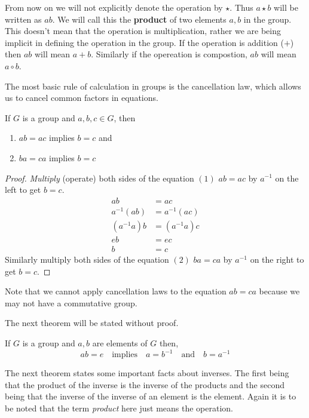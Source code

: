 \begin{Remark}\label{rmk:prod_notation}
    From now on we will not explicitly denote the operation by $\star$. Thus $a \star b$ will be written
    as $ab$. We will call this the \textbf{product} of two elements $a,b$ in the group. This doesn't mean that the
    operation is multiplication, rather we are being implicit in defining the operation in the group. If the
    operation is addition ($+$) then $ab$ will mean $a+b$. Similarly if the opereation is compostion, 
    $ab$ will mean $a\circ b$.
\end{Remark}

The most basic rule of calculation in groups is the cancellation law, which allows us to cancel
common factors in equations. 
\begin{Theorem}[name=Cancellation Laws in Groups]
    If $G$ is a group and $a,b,c \in G$, then
    \begin{enumerate}
	\item $ab = ac$ implies $b=c$ and
	\item $ba = ca$ implies $b=c$
    \end{enumerate}
\end{Theorem}
\begin{proof}
    \emph{Multiply} (operate) both sides of the equation $(1)$ $ab = ac$ by $a^{-1}$ on the left 
    to get $b = c$. 
    \begin{align*}
	ab & = ac \\
	a^{-1}(ab) & = a^{-1}(ac) \\
	(a^{-1}a)b & = (a^{-1}a)c \\
	eb & = ec \\
	b & = c
    \end{align*}
    Similarly multiply both sides of the equation $(2)$ $ba = ca$ by $a^{-1}$ on the
    right to get $b=c$.
\end{proof}
Note that we cannot apply cancellation laws to the equation $ab = ca$ because we may not have
a commutative group.

The next theorem will be stated without proof. 
\begin{Theorem}
    If $G$ is a group and $a,b$ are elements of $G$ then,
    \begin{equation*}
	ab = e \quad \text{implies} \quad a = b^{-1} \quad \text{and} \quad b = a^{-1}
    \end{equation*}
\end{Theorem}

The next theorem states some important facts about inverses. The first being that the product of the
inverse is the inverse of the products and the second being that the inverse of the inverse of an
element is the element. Again it is to be noted that the term \emph{product} here just means the
operation.

